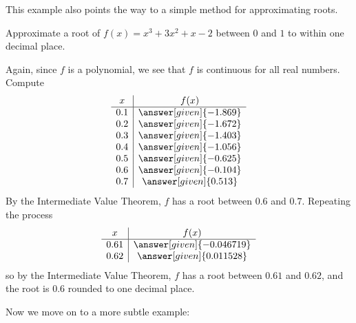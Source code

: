\documentclass{ximera}
\begin{document}
This example also points the way to a simple method for approximating
roots. 



\begin{example} 
Approximate a root of $f(x) =x^3 + 3x^2+x-2$ between $0$ and $1$ to
within one decimal place.

\begin{explanation} 
Again, since $f$ is a polynomial, we see that $f$ is continuous for
all real numbers. Compute
\[
\begin{array}{c|c}
  x   & f(x) \\ \hline
  0.1 & \answer[given]{-1.869}\\
  0.2 & \answer[given]{-1.672}\\
  0.3 & \answer[given]{-1.403}\\
  0.4 & \answer[given]{-1.056}\\
  0.5 & \answer[given]{-0.625}\\
  0.6 & \answer[given]{-0.104}\\
  0.7 & \answer[given]{0.513}
\end{array}
\]
By the Intermediate Value Theorem, $f$ has a root between $0.6$ and
$0.7$. Repeating the process
\[
\begin{array}{c|c}
  x   & f(x) \\ \hline
  0.61 & \answer[given]{-0.046719}\\
  0.62 & \answer[given]{0.011528}
\end{array}
\]
so by the Intermediate Value Theorem, $f$ has a root between $0.61$
and $0.62$, and the root is $0.6$ rounded to one decimal place.
\end{explanation}
\end{example}



Now we move on to a more subtle example:
\end{document}
